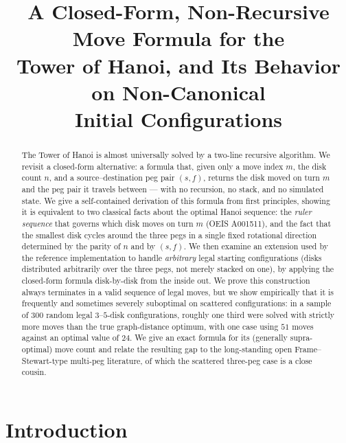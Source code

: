 \documentclass[11pt]{article}
\title{A Closed-Form, Non-Recursive Move Formula for the\\
Tower of Hanoi, and Its Behavior on Non-Canonical\\
Initial Configurations}
\author{}
\date{}
\begin{document}
\maketitle

\begin{abstract}
The Tower of Hanoi is almost universally solved by a two-line recursive
algorithm. We revisit a closed-form alternative: a formula that, given only
a move index $m$, the disk count $n$, and a source--destination peg pair
$(s,f)$, returns the disk moved on turn $m$ and the peg pair it travels
between --- with no recursion, no stack, and no simulated state. We give a
self-contained derivation of this formula from first principles, showing it
is equivalent to two classical facts about the optimal Hanoi sequence: the
\emph{ruler sequence} that governs which disk moves on turn $m$
(OEIS A001511), and the fact that the smallest disk cycles around the three
pegs in a single fixed rotational direction determined by the parity of $n$
and by $(s,f)$. We then examine an extension used by the reference
implementation to handle \emph{arbitrary} legal starting configurations
(disks distributed arbitrarily over the three pegs, not merely stacked on
one), by applying the closed-form formula disk-by-disk from the inside out.
We prove this construction always terminates in a valid sequence of legal
moves, but we show empirically that it is frequently and sometimes severely
suboptimal on scattered configurations: in a sample of $300$ random legal
$3$--$5$-disk configurations, roughly one third were solved with strictly
more moves than the true graph-distance optimum, with one case using
$51$ moves against an optimal value of $24$. We give an exact formula for
its (generally supra-optimal) move count and relate the resulting gap to the
long-standing open Frame--Stewart-type multi-peg literature, of which the
scattered three-peg case is a close cousin.
\end{abstract}

\tableofcontents

\section{Introduction}
\end{document}
